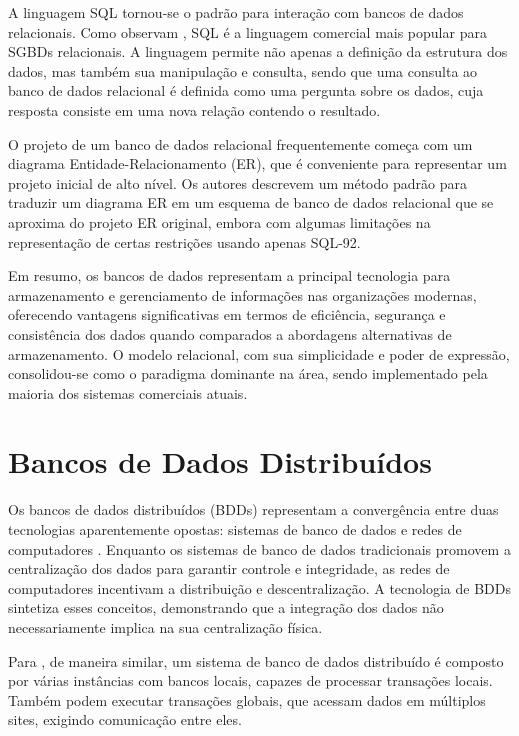 A linguagem SQL tornou-se o padrão para interação com bancos de dados relacionais. Como observam , SQL é a linguagem comercial mais popular para SGBDs relacionais. A linguagem permite não apenas a definição da estrutura dos dados, mas também sua manipulação e consulta, sendo que uma consulta ao banco de dados relacional é definida como uma pergunta sobre os dados, cuja resposta consiste em uma nova relação contendo o resultado.

O projeto de um banco de dados relacional frequentemente começa com um diagrama Entidade-Relacionamento (ER), que é conveniente para representar um projeto inicial de alto nível. Os autores descrevem um método padrão para traduzir um diagrama ER em um esquema de banco de dados relacional que se aproxima do projeto ER original, embora com algumas limitações na representação de certas restrições usando apenas SQL-92.

Em resumo, os bancos de dados representam a principal tecnologia para armazenamento e gerenciamento de informações nas organizações modernas, oferecendo vantagens significativas em termos de eficiência, segurança e consistência dos dados quando comparados a abordagens alternativas de armazenamento. O modelo relacional, com sua simplicidade e poder de expressão, consolidou-se como o paradigma dominante na área, sendo implementado pela maioria dos sistemas comerciais atuais.

\section{Bancos de Dados Distribuídos}

Os bancos de dados distribuídos (BDDs) representam a convergência entre duas tecnologias aparentemente opostas: sistemas de banco de dados e redes de computadores . Enquanto os sistemas de banco de dados tradicionais promovem a centralização dos dados para garantir controle e integridade, as redes de computadores incentivam a distribuição e descentralização. A tecnologia de BDDs sintetiza esses conceitos, demonstrando que a integração dos dados não necessariamente implica na sua centralização física.

Para , de maneira similar, um sistema de banco de dados distribuído é composto por várias instâncias com bancos locais, capazes de processar transações locais. Também podem executar transações globais, que acessam dados em múltiplos sites, exigindo comunicação entre eles.

